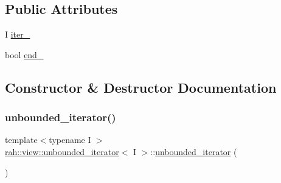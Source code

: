 \subsection*{Public Attributes}
\begin{DoxyCompactItemize}
\item 
I \mbox{\hyperlink{structrah_1_1view_1_1unbounded__iterator_a50affaae71d4122b92014b11763f6672}{iter\+\_\+}}
\item 
bool \mbox{\hyperlink{structrah_1_1view_1_1unbounded__iterator_a5af8d60be5952969ccbad7ef9ce670e4}{end\+\_\+}}
\end{DoxyCompactItemize}


\subsection{Constructor \& Destructor Documentation}
\mbox{\label{structrah_1_1view_1_1unbounded__iterator_aecc43db612ed5ad8e6002356feb92b48}} 
\subsubsection{\texorpdfstring{unbounded\_iterator()}{unbounded\_iterator()}\hspace{0.1cm}{\footnotesize\ttfamily [1/2]}}
{\footnotesize\ttfamily template$<$typename I $>$ \\
\mbox{\hyperlink{structrah_1_1view_1_1unbounded__iterator}{rah\+::view\+::unbounded\+\_\+iterator}}$<$ I $>$\+::\mbox{\hyperlink{structrah_1_1view_1_1unbounded__iterator}{unbounded\+\_\+iterator}} (\begin{DoxyParamCaption}{ }\end{DoxyParamCaption})\hspace{0.3cm}{\ttfamily [default]}}

\mbox{\label{structrah_1_1view_1_1unbounded__iterator_a6043d431a0b2db6691397dd8029287b4}} 
